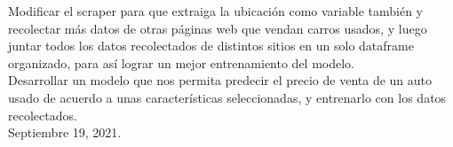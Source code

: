 \documentclass[journal]{..//IEEEtran/IEEEtran}
\begin{document}
Modificar el scraper para que extraiga la ubicación como variable también y recolectar más datos de otras páginas web que vendan carros usados, y luego juntar todos los datos recolectados de distintos sitios en un solo dataframe organizado, para así lograr un mejor entrenamiento del modelo.\\

Desarrollar un modelo que nos permita predecir el precio de venta de un auto usado de acuerdo a unas características seleccionadas, y entrenarlo con los datos recolectados.\\



\hfill Septiembre 19, 2021.
\end{document}
